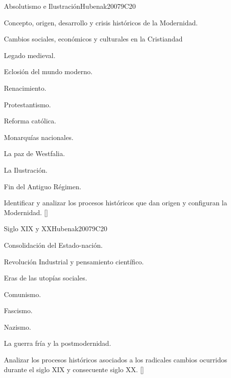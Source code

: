 \begin{syllabus}
\begin{unit}{}{Absolutismo e Ilustración}{Hubenak2007}{9}{C20}
\begin{topics}
	\item Concepto, origen, desarrollo y crisis históricos de la Modernidad.
	\item Cambios sociales, económicos y culturales en la Cristiandad
	      \begin{subtopics}
		\item Legado medieval.
		\item Eclosión del mundo moderno.
	      \end{subtopics}
	\item Renacimiento.
	\item Protestantismo.
	\item Reforma católica.
	\item Monarquías nacionales.
	\item La paz de Westfalia.
	\item La Ilustración.
	\item Fin del Antiguo Régimen.
\end{topics}
\begin{learningoutcomes}
	\item Identificar y analizar los procesos históricos que dan origen y configuran la Modernidad. [\Familiarity]
\end{learningoutcomes}
\end{unit}

\begin{unit}{}{Siglo XIX y XX}{Hubenak2007}{9}{C20}
\begin{topics}
	\item Consolidación del Estado-nación.
	\item Revolución Industrial y pensamiento científico.
	\item Eras de las utopías sociales.
	      \begin{subtopics}
		\item Comunismo.
		\item Fascismo.
		\item Nazismo.
	      \end{subtopics}
	\item La guerra fría y la postmodernidad.
\end{topics}
\begin{learningoutcomes}
	\item Analizar los procesos históricos asociados a los radicales cambios ocurridos durante el siglo XIX y consecuente siglo XX. [\Familiarity]
\end{learningoutcomes}
\end{unit}


\end{syllabus}
